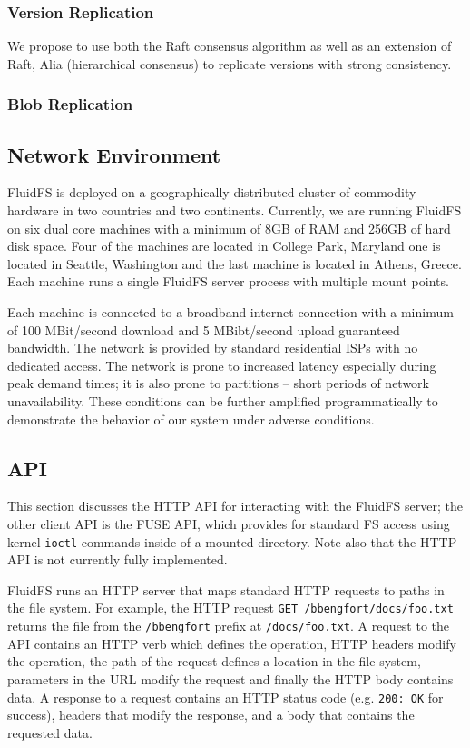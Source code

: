 \documentclass[letterpaper,twocolumn,10pt]{article}
\begin{document}
\subsubsection*{Version Replication}

We propose to use both the Raft consensus algorithm as well as an extension
of Raft, Alia (hierarchical consensus) to replicate versions with strong
consistency.


\subsubsection*{Blob Replication}



\subsection*{Network Environment}

FluidFS is deployed on a geographically distributed cluster of commodity
hardware in two countries and two continents.
Currently, we are running FluidFS on six dual core machines with a minimum of
8GB of RAM and 256GB of hard disk space.
Four of the machines are located in College Park, Maryland one is located in
Seattle, Washington and the last machine is located in Athens, Greece.
Each machine runs a single FluidFS server process with multiple mount points.

Each machine is connected to a broadband internet connection with a minimum
of 100 MBit/second download and 5 MBibt/second upload guaranteed bandwidth.
The network is provided by standard residential ISPs with no dedicated
access.
The network is prone to increased latency especially during peak demand
times; it is also prone to partitions -- short periods of network
unavailability.
These conditions can be further amplified programmatically to demonstrate the
behavior of our system under adverse conditions.

\subsection*{API}

This section discusses the HTTP API for interacting with the FluidFS server;
the other client API is the FUSE API, which provides for standard FS access
using kernel \texttt{ioctl} commands inside of a mounted directory.
Note also that the HTTP API is not currently fully implemented.

FluidFS runs an HTTP server that maps standard HTTP requests to paths in the
file system.
For example, the HTTP request \texttt{GET /bbengfort/docs/foo.txt} returns
the file from the \texttt{/bbengfort} prefix at \texttt{/docs/foo.txt}.
A request to the API contains an HTTP verb which defines the operation,
HTTP headers modify the operation, the path of the request defines a location
in the file system, parameters in the URL modify the request and finally the
HTTP body contains data.
A response to a request contains an HTTP status code (e.g. \texttt{200: OK}
for success), headers that modify the response, and a body that contains the
requested data.
\end{document}
